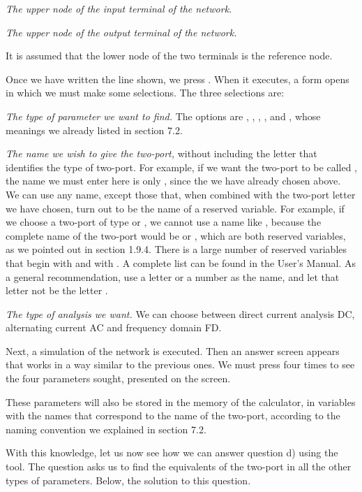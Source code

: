 \emph{The upper node of the input terminal of the network.}

\emph{The upper node of the output terminal of the network.}

It is assumed that the lower node of the two terminals is the
reference node.

Once we have written the line shown, we press . When it
executes, a form opens in which we must make some selections. The
three selections are:

\emph{The type of parameter we want to find.} The options are
, , , ,  and , whose
meanings we already listed in section 7.2.

\emph{The name we wish to give the two-port,} without including the
letter that identifies the type of two-port. For example, if we want
the two-port to be called , the name we must enter here is
only , since the  we have already chosen above. We
can use any name, except those that, when combined with the two-port
letter we have chosen, turn out to be the name of a reserved
variable. For example, if we choose a two-port of type  or
, we cannot use a name like , because the complete
name of the two-port would be  or , which are both
reserved variables, as we pointed out in section 1.9.4. There is a
large number of reserved variables that begin with  and with
. A complete list can be found in the User's Manual. As a
general recommendation, use a letter or a number as the name, and
let that letter not be the letter .

\emph{The type of analysis we want.} We can choose between direct
current analysis DC, alternating current AC and frequency domain
FD.

Next, a simulation of the network is executed. Then an answer screen
appears that works in a way similar to the previous ones. We must
press  four times to see the four parameters sought,
presented on the screen.

These parameters will also be stored in the memory of the
calculator, in variables with the names that correspond to the name
of the two-port, according to the naming convention we explained in
section 7.2.

With this knowledge, let us now see how we can answer question d)
using the  tool. The question asks us to find the
equivalents of the two-port in all the other types of parameters.
Below, the solution to this question.

